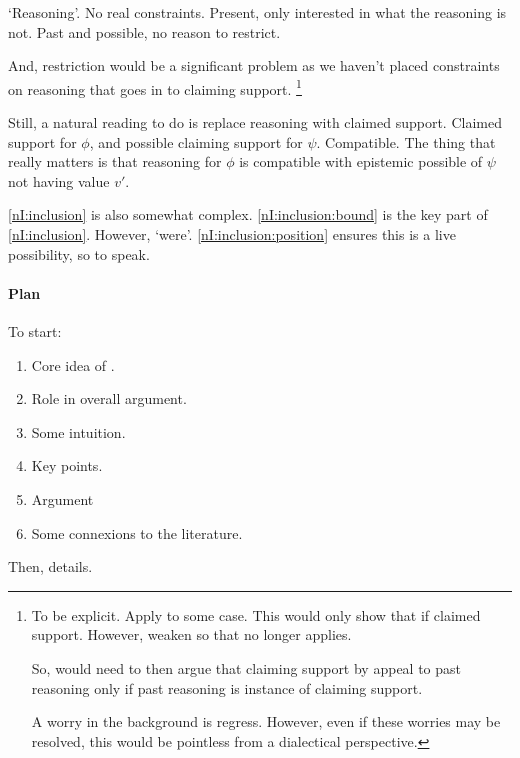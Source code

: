 \begin{note}
  `Reasoning'.
  No real constraints.
  Present, only interested in what the reasoning is not.
  Past and possible, no reason to restrict.

    And, restriction would be a significant problem as we haven't placed constraints on reasoning that goes in to claiming support.\nolinebreak
  \footnote{
    To be explicit.
    Apply \nI{} to some case.
    This would only show that if claimed support.
    However, weaken so that \nI{} no longer applies.

    So, would need to then argue that claiming support by appeal to past reasoning only if past reasoning is instance of claiming support.

    A worry in the background is regress.
    However, even if these worries may be resolved, this would be pointless from a dialectical perspective.
  }

  Still, a natural reading to do is replace reasoning with claimed support.
  Claimed support for \(\phi\), and possible claiming support for \(\psi\).
  Compatible.
  The thing that really matters is that reasoning for \(\phi\) is compatible with epistemic possible of \(\psi\) not having value \(v'\).
\end{note}

\begin{note}
  \ref{nI:inclusion} is also somewhat complex.
  \ref{nI:inclusion:bound} is the key part of \ref{nI:inclusion}.
  However, `were'.
  \ref{nI:inclusion:position} ensures this is a live possibility, so to speak.
\end{note}

\paragraph{Plan}

\begin{note}[Plan]
  To start:
  \begin{enumerate}
  \item Core idea of \nI{}.
  \item Role in overall argument.
  \item Some intuition.
  \item Key points.
  \item Argument
  \item Some connexions to the literature.
  \end{enumerate}
  Then, details.
\end{note}

